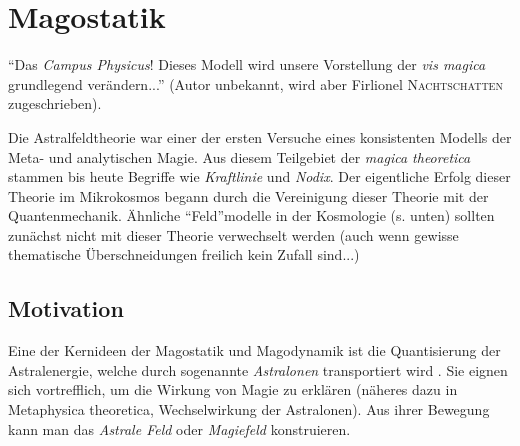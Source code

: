 \chapter[tocentry=Magostatik, head=Magostatik]{Magostatik}
"`Das \emph{Campus Physicus}! Dieses Modell wird unsere Vorstellung der \emph{vis magica} grundlegend verändern..."' (Autor unbekannt, wird aber Firlionel \textsc{Nachtschatten} zugeschrieben).

Die Astralfeldtheorie war einer der ersten Versuche eines konsistenten Modells der Meta- und analytischen Magie. Aus diesem Teilgebiet der \emph{magica theoretica} stammen bis heute Begriffe wie \emph{Kraftlinie} und \emph{Nodix}. Der eigentliche Erfolg dieser Theorie im Mikrokosmos begann durch die Vereinigung dieser Theorie mit der Quantenmechanik.  Ähnliche "`Feld"'modelle in der Kosmologie (s. unten) sollten zunächst nicht mit dieser Theorie verwechselt werden (auch wenn gewisse thematische Überschneidungen freilich kein Zufall sind...)

\section{Motivation}
Eine der Kernideen der Magostatik und Magodynamik ist die Quantisierung der Astralenergie, welche durch sogenannte \emph{Astralonen} transportiert wird \cite{quanten}. Sie eignen sich vortrefflich, um die Wirkung von Magie zu erklären (näheres dazu in Metaphysica theoretica, Wechselwirkung der Astralonen). Aus ihrer Bewegung kann man das \emph{Astrale Feld} oder \emph{Magiefeld} konstruieren.

